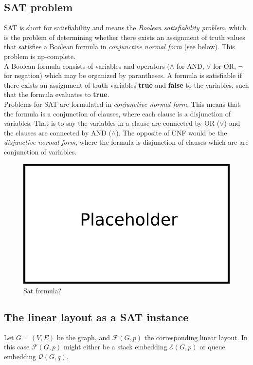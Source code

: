 \subsection{SAT problem}
SAT is short for satisfiability and means the \textit{Boolean satisfiability problem}, which is the problem of determining whether there exists an assignment of truth values that satisfies a Boolean formula in \textit{conjunctive normal form} (see below). This problem is np-complete. \\
A Boolean formula consists of variables and operators ($\land$ for AND, $\lor$ for OR, $\neg$ for negation) which may be organized by parantheses. A formula is satisfiable if there exists an assignment of truth variables \textbf{true} and \textbf{false} to the variables, such that the formula evaluates to \textbf{true}.\\
Problems for SAT are formulated in \textit{conjunctive normal form}.
This means that the formula is a conjunction of clauses, where each clause is a disjunction of variables. That is to say the variables in a clause are connected by OR ($\lor$) and the clauses are connected by AND ($\land$). The opposite of CNF would be the \textit{disjunctive normal form}, where the formula is disjunction of clauses which are are conjunction of variables. 
\begin{figure}[!h]
\begin{center}
\includegraphics[width=1\textwidth]{figures/Platzhalter.png}
\caption{Sat formula?}
\label{img:plzhltr}
\end{center}
\end{figure}
\subsection{The linear layout as a SAT instance}
Let $G=(V,E)$ be the graph, and $\mathcal{F}(G,p)$ the corresponding linear layout. In this case $\mathcal{F}(G,p)$ might either be a stack embedding $\mathcal{E}(G,p)$ or queue embedding $\mathcal{Q}(G,q)$.\\
